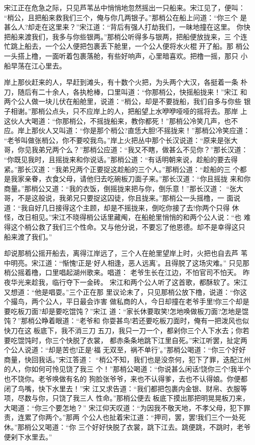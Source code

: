 宋江正在危急之际，只见芦苇丛中悄悄地忽然摇出一只船来。宋江见了，便叫：
“梢公，且把船来救我们三个，俺与你几两银子。”那梢公在船上问道：“你三个
是甚么人?却走在这里来？”宋江道：“背后有强人打劫我们，一昧地撞在这里。
你快把船来渡我们，我多与你些银两。”那梢公听得多与银两，把船便放拢来，三
个连忙跳上船去，一个公人便把包裹丢下舱里，一个公人便将水火棍开了船。那
梢公一头搭上橹，一面听着包裹落舱，有些好响声，心里暗喜欢。把橹一摇，那只
小船早荡在江心里去。

岸上那伙赶来的人，早赶到滩头，有十数个火把，为头两个大汉，各挺着一条
朴刀，随后有二十余人，各执枪棒，口里叫道：“你那梢公，快摇船拢来！”宋江
和两个公人做一块儿伏在船舱里，说道：“梢公，却是不要拢船，我们自多与你些
银子相谢。”那梢公点头，只不应岸上的人，把船望上水咿咿哑哑的摇将去。那岸
上这伙人大喝道：“你那梢公，不摇拢船来，教你都死！”那梢公冷笑几声，也不
应。岸上那伙人又叫道：“你是那个梢公?直恁大胆!不摇拢来！”那梢公冷笑应道：
“老爷叫做张梢公，你不要咬我鸟。”岸上火把丛中那个长汉说道：“原来是张大
哥，你见我弟兄两个么？”那梢公应道：“我又不瞎，做甚么不见你？”那长汉道：
“你既见我时，且摇拢来和你说话。”那梢公道：“有话明朝来说，趁船的要去得
紧。”那长汉道：“我弟兄两个正要捉这趁船的三个人。”那梢公道：“趁船的三
个都是我家亲眷，衣食父母，请他归去吃碗板刀面子来。”那长汉道：“你且摇拢
来和你商量。”那梢公又道：“我的衣饭，倒摇拢来把与你，倒乐意！”那长汉道：
“张大哥，不是这般说，我弟兄只要捉这囚徒，你且拢来。”那梢公一头摇橹，一
面说道：“我自好几日接得这个主顾，却是不摇拢来，倒吃你接了去!你两个只得
休怪，改日相见。”宋江不晓得梢公话里藏阄，在船舱里悄悄的和两个公人说：“也
难得这个梢公救了我们三个性命。又与他分说，不要忘了他恩德。却不是幸得这只
船来渡了我们。”

却说那梢公摇开船去，离得江岸远了，三个人在舱里望岸上时，火把也自去芦
苇中明亮。宋江道：“惭愧!正是‘好人相逢，恶人远离’。且得脱了这场灾难。”
只见那梢公摇着橹，口里唱起湖州歌来。唱道：
老爷生长在江边，不怕官司不怕天。
昨夜华光来趁我，临行夺下一金砖。
宋江和两个公人听了这首歌，都酥软了。宋江又想道：“他是唱耍。”三个正在那
里议论未了，只见那梢公放下橹，说道：“你这个撮鸟，两个公人，平日最会诈害
做私商的人，今日却撞在老爷手里!你三个却是要吃板刀面?却是要吃馄饨？”宋江
道：“家长休要取笑!怎地唤做板刀面?怎地是馄饨？”那梢公睁着眼道：“老爷和
你耍甚鸟!若还要吃板刀面时，俺有一把泼风也似快刀在这板底下，我不消三刀
五刀，我只一刀一个，都剁你三个人下水去；你若要吃馄饨时，你三个快脱了衣裳，
都赤条条地跳下江里自死。”宋江听罢，扯定两个公人说道：“却是苦也!正是‘福
无双至，祸不单行’。”那梢公喝道：“你三个好好商量，快回我话。”宋江答道：
“梢公不知，我们也是没奈何，犯下了罪，迭配江州的人，你如何可怜见饶了我三
个！”那梢公喝道：“你说甚么闲话!饶你三个!我半个也不饶你。老爷唤做有名的
狗脸张爷爷，来也不认得爹，去也不认得娘。你便都闭了鸟嘴，快下水里去！”宋
江又求告道：“我们都把包裹内金银、财帛、衣服等项，尽数与你，只饶了我三人
性命。”那梢公便去板底下摸出那把明晃晃板刀来，大喝道：“你三个要怎地？”
宋江仰天叹道：“为因我不敬天地，不孝父母，犯下罪责，连累了你两个。”那两
个公人也扯着宋江道：“押司，罢，罢!我们三个一处死休。”那梢公又喝道：“你
三个好好快脱了衣裳，跳下江去。跳便跳，不跳时，老爷便剁下水里去。”

